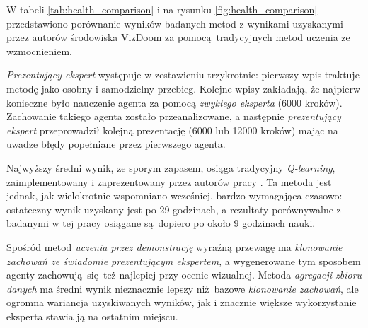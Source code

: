 W tabeli \ref{tab:health_comparison} i na rysunku \ref{fig:health_comparison} przedstawiono porównanie wyników badanych metod z wynikami uzyskanymi przez autorów środowiska VizDoom za pomocą tradycyjnych metod uczenia ze wzmocnieniem.

\begin{figure}[H]
\end{figure}

\textit{Prezentujący ekspert} występuje w zestawieniu trzykrotnie: pierwszy wpis traktuje metodę jako osobny i samodzielny przebieg. Kolejne wpisy zakładają, że najpierw konieczne było nauczenie agenta za pomocą \textit{zwykłego eksperta} (6000 kroków). Zachowanie takiego agenta zostało przeanalizowane, a następnie \textit{prezentujący ekspert} przeprowadził kolejną prezentację (6000 lub 12000 kroków) mając na uwadze błędy popełniane przez pierwszego agenta.

Najwyższy średni wynik, ze sporym zapasem, osiąga tradycyjny \textit{Q-learning}, zaimplementowany i zaprezentowany przez autorów pracy \cite{DBLP:journals/corr/KempkaWRTJ16}. Ta metoda jest jednak, jak wielokrotnie wspomniano wcześniej, bardzo wymagająca czasowo: ostateczny wynik uzyskany jest po 29 godzinach, a rezultaty porównywalne z badanymi w tej pracy osiągane są dopiero po około 9 godzinach nauki.

Spośród metod \textit{uczenia przez demonstrację} wyraźną przewagę ma \textit{klonowanie zachowań ze świadomie prezentującym ekspertem}, a wygenerowane tym sposobem agenty zachowują się też najlepiej przy ocenie wizualnej. Metoda \textit{agregacji zbioru danych} ma średni wynik nieznacznie lepszy niż bazowe \textit{klonowanie zachowań}, ale ogromna wariancja uzyskiwanych wyników, jak i znacznie większe wykorzystanie eksperta stawia ją na ostatnim miejscu.

